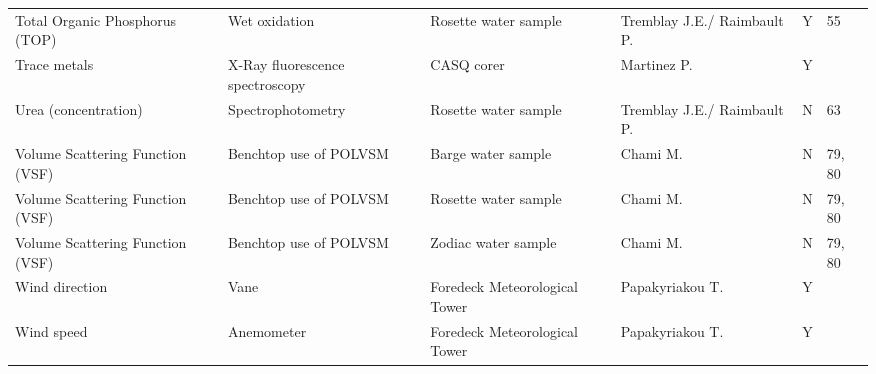 \begin{ThreePartTable}
\begin{longtable}[t]{llllll}
Total Organic Phosphorus (TOP) & Wet oxidation & Rosette water sample & Tremblay J.E./ Raimbault P. & Y & 55\\
\addlinespace
Trace metals & X-Ray fluorescence spectroscopy & CASQ corer & Martinez P. & Y & \\
Urea (concentration) & Spectrophotometry & Rosette water sample & Tremblay J.E./ Raimbault P. & N & 63\\
Volume Scattering Function (VSF) & Benchtop use of POLVSM & Barge water sample & Chami M. & N & 79, 80\\
Volume Scattering Function (VSF) & Benchtop use of POLVSM & Rosette water sample & Chami M. & N & 79, 80\\
Volume Scattering Function (VSF) & Benchtop use of POLVSM & Zodiac water sample & Chami M. & N & 79, 80\\
\addlinespace
Wind direction & Vane & Foredeck Meteorological Tower & Papakyriakou T. & Y & \\
Wind speed & Anemometer & Foredeck Meteorological Tower & Papakyriakou T. & Y & \\*
\end{longtable}
\end{ThreePartTable}
\endgroup{}
